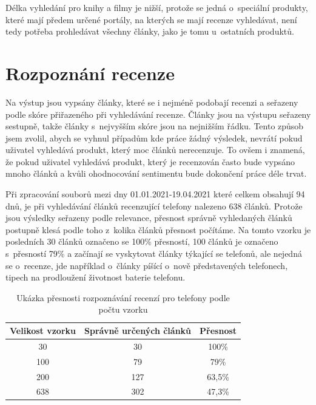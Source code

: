 Délka vyhledání pro knihy a filmy je nižší, protože se jedná o~speciální produkty, které mají předem určené portály, na kterých se mají recenze vyhledávat, není tedy potřeba prohledávat všechny články, jako je tomu u~ostatních produktů.

\section{Rozpoznání recenze}

Na výstup jsou vypsány články, které se i nejméně podobají recenzi a seřazeny podle skóre přiřazeného při vyhledávání recenze. Články jsou na výstupu seřazeny sestupně, takže články s~nejvyšším skóre jsou na nejnižším řádku. Tento způsob jsem zvolil, abych se vyhnul případům kde práce žádný výsledek, nevrátí pokud uživatel vyhledává produkt, který moc článků nerecenzuje. To ovšem i znamená, že pokud uživatel vyhledává produkt, který je recenzován často bude vypsáno mnoho článků a kvůli ohodnocování sentimentu bude dokončení práce déle trvat. 

Při zpracování souborů mezi dny 01.01.2021-19.04.2021 které celkem obsahují 94 dnů, je při vyhledávání článků recenzující telefony nalezeno 638 článků. Protože jsou výsledky seřazeny podle relevance, přesnost správně vyhledaných článků postupně klesá podle toho z~kolika článků přesnost počítáme. Na tomto vzorku je posledních 30 článků označeno se 100\% přesností, 100 článků je označeno s~přesností 79\% a začínají se vyskytovat články týkající se telefonů, ale nejedná se o~recenze, jde například o~články píšící o~nově představených telefonech, tipech na prodloužení životnost baterie telefonu. 

\begin{table}[h]
    \centering
    \begin{tabular}{|c|c|c|}
        \hline
        Velikost vzorku & Správně určených článků & Přesnost \\
        \hline\hline
        30  & 30 & 100\% \\
        \hline
        100 & 79 & 79\% \\
        \hline
        200 & 127 & 63,5\%  \\
        \hline
        638 & 302 & 47,3\%  \\
        \hline
    \end{tabular}
    \caption{Ukázka přesnosti rozpoznávání recenzí pro telefony podle počtu vzorku}
    \label{tab:telefony_presnost_podle_vzorku}
\end{table}

